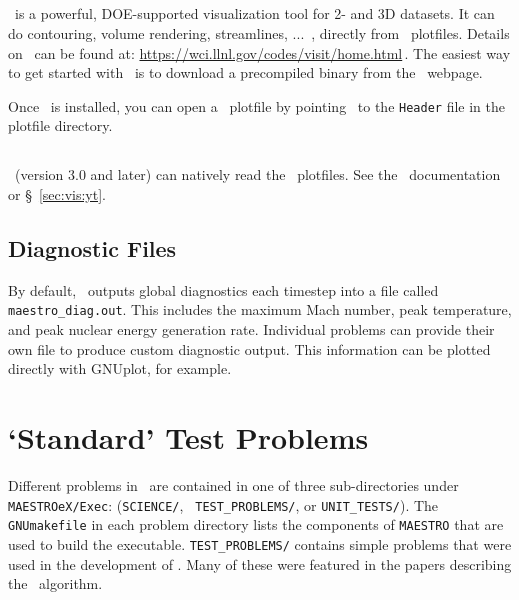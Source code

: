 \subsection{\visit}

\visit\ is a powerful, DOE-supported visualization tool for 2- and 3D
datasets.  It can do contouring, volume rendering, streamlines, ...\, ,
directly from \amrex\ plotfiles.   Details on
\visit\ can be found at:\newline
 \url{https://wci.llnl.gov/codes/visit/home.html}\,. \newline
The easiest way to get started with \visit\ is to download a precompiled
binary from the \visit\ webpage.

Once \visit\ is installed, you can open a \amrex\ plotfile by pointing
\visit\ to the {\tt Header} file in the plotfile directory.


\subsection{\yt}

\yt\ (version 3.0 and later) can natively read the \maestroex\ plotfiles.  See
the \yt\ documentation or \S~\ref{sec:vis:yt}.



\subsection{Diagnostic Files}

By default, \maestroex\ outputs global diagnostics each timestep into a
file called {\tt maestro\_diag.out}.  This includes the maximum Mach
number, peak temperature, and peak nuclear energy generation rate.
Individual problems can provide their own  file to
produce custom diagnostic output.  This information can be plotted
directly with {\sf GNUplot}, for example.




\section{`Standard' Test Problems}

Different problems in \maestroex\ are contained in one of three
sub-directories under {\tt MAESTROeX/Exec}: ({\tt SCIENCE/}, {\tt
TEST\_PROBLEMS/}, or {\tt UNIT\_TESTS/}).  The {\tt GNUmakefile} in each
problem directory lists the components of {\tt MAESTRO} that are used
to build the executable.  {\tt TEST\_PROBLEMS/} contains simple
problems that were used in the development of \maestroex.  Many
of these were featured in the papers describing the \maestroex\ algorithm.


